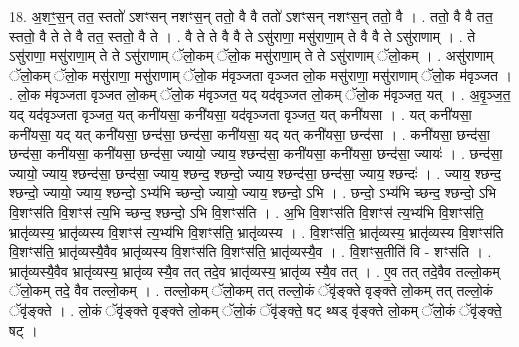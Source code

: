 \documentclass[17pt]{extarticle}
\begin{document}
18. अ॒शꣳ॒॒स॒न् तत॒ स्ततो॑ ऽशꣳसन् नशꣳस॒न् ततो॒ वै वै ततो॑ ऽशꣳसन् नशꣳस॒न् ततो॒ वै । . ततो॒ वै वै तत॒ स्ततो॒ वै ते ते वै तत॒ स्ततो॒ वै ते । . वै ते ते वै वै ते ऽसु॑राणा॒ मसु॑राणा॒म् ते वै वै ते ऽसु॑राणाम् । . ते ऽसु॑राणा॒ मसु॑राणा॒म् ते ते ऽसु॑राणाम् ॅलो॒कम् ॅलो॒क मसु॑राणा॒म् ते ते ऽसु॑राणाम् ॅलो॒कम् । . असु॑राणाम् ॅलो॒कम् ॅलो॒क मसु॑राणा॒ मसु॑राणाम् ॅलो॒क म॑वृञ्जता वृञ्जत लो॒क मसु॑राणा॒ मसु॑राणाम् ॅलो॒क म॑वृञ्जत । . लो॒क म॑वृञ्जता वृञ्जत लो॒कम् ॅलो॒क म॑वृञ्जत॒ यद् यद॑वृञ्जत लो॒कम् ॅलो॒क म॑वृञ्जत॒ यत् । . अ॒वृ॒ञ्ज॒त॒ यद् यद॑वृञ्जता वृञ्जत॒ यत् कनी॑यसा॒ कनी॑यसा॒ यद॑वृञ्जता वृञ्जत॒ यत् कनी॑यसा । . यत् कनी॑यसा॒ कनी॑यसा॒ यद् यत् कनी॑यसा॒ छन्द॑सा॒ छन्द॑सा॒ कनी॑यसा॒ यद् यत् कनी॑यसा॒ छन्द॑सा । . कनी॑यसा॒ छन्द॑सा॒ छन्द॑सा॒ कनी॑यसा॒ कनी॑यसा॒ छन्द॑सा॒ ज्यायो॒ ज्याय॒ श्छन्द॑सा॒ कनी॑यसा॒ कनी॑यसा॒ छन्द॑सा॒ ज्यायः॑ । . छन्द॑सा॒ ज्यायो॒ ज्याय॒ श्छन्द॑सा॒ छन्द॑सा॒ ज्याय॒ श्छन्द॒ श्छन्दो॒ ज्याय॒ श्छन्द॑सा॒ छन्द॑सा॒ ज्याय॒ श्छन्दः॑ । . ज्याय॒ श्छन्द॒ श्छन्दो॒ ज्यायो॒ ज्याय॒ श्छन्दो॒ ऽभ्य॑भि च्छन्दो॒ ज्यायो॒ ज्याय॒ श्छन्दो॒ ऽभि । . छन्दो॒ ऽभ्य॑भि च्छन्द॒ श्छन्दो॒ ऽभि वि॒शꣳस॑ति वि॒शꣳस॑ त्य॒भि च्छन्द॒ श्छन्दो॒ ऽभि वि॒शꣳस॑ति । . अ॒भि वि॒शꣳस॑ति वि॒शꣳस॑ त्य॒भ्य॑भि वि॒शꣳस॑ति॒ भ्रातृ॑व्यस्य॒ भ्रातृ॑व्यस्य वि॒शꣳस॑ त्य॒भ्य॑भि वि॒शꣳस॑ति॒ भ्रातृ॑व्यस्य । . वि॒शꣳस॑ति॒ भ्रातृ॑व्यस्य॒ भ्रातृ॑व्यस्य वि॒शꣳस॑ति वि॒शꣳस॑ति॒ भ्रातृ॑व्यस्यै॒वैव भ्रातृ॑व्यस्य वि॒शꣳस॑ति वि॒शꣳस॑ति॒ भ्रातृ॑व्यस्यै॒व । . वि॒शꣳस॒तीति॑ वि - शꣳस॑ति । . भ्रातृ॑व्यस्यै॒वैव भ्रातृ॑व्यस्य॒ भ्रातृ॑व्य स्यै॒व तत् तदे॒व भ्रातृ॑व्यस्य॒ भ्रातृ॑व्य स्यै॒व तत् । . ए॒व तत् तदे॒वैव तल्लो॒कम् ॅलो॒कम् तदे॒ वैव तल्लो॒कम् । . तल्लो॒कम् ॅलो॒कम् तत् तल्लो॒कं ॅवृ॑ङ्क्ते वृङ्क्ते लो॒कम् तत् तल्लो॒कं ॅवृ॑ङ्क्ते । . लो॒कं ॅवृ॑ङ्क्ते वृङ्क्ते लो॒कम् ॅलो॒कं ॅवृ॑ङ्क्ते॒ षट् थ्षड् वृ॑ङ्क्ते लो॒कम् ॅलो॒कं ॅवृ॑ङ्क्ते॒ षट् । \newline
\end{document}
